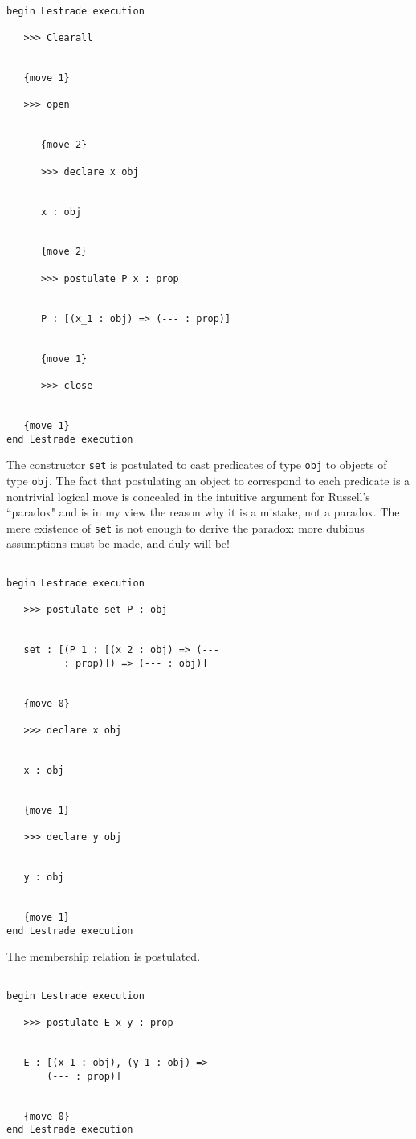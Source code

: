 \documentclass[12pt]{article}
\begin{document}
\newpage

\begin{verbatim}

begin Lestrade execution

   >>> Clearall


   {move 1}

   >>> open


      {move 2}

      >>> declare x obj


      x : obj


      {move 2}

      >>> postulate P x : prop


      P : [(x_1 : obj) => (--- : prop)]


      {move 1}

      >>> close


   {move 1}
end Lestrade execution
\end{verbatim}

The constructor {\tt set} is postulated to cast predicates of type {\tt obj} to objects of type {\tt obj}.  The fact that postulating an object to correspond to each predicate is a nontrivial logical move is concealed in the intuitive argument for Russell's ``paradox"  and is in my view the reason why it is a mistake, not a paradox.  The mere existence of {\tt set} is not enough to derive the paradox:  more dubious assumptions must be made, and duly will be!

\begin{verbatim}

begin Lestrade execution

   >>> postulate set P : obj


   set : [(P_1 : [(x_2 : obj) => (--- 
          : prop)]) => (--- : obj)]


   {move 0}

   >>> declare x obj


   x : obj


   {move 1}

   >>> declare y obj


   y : obj


   {move 1}
end Lestrade execution
\end{verbatim}

The membership relation is postulated.

\begin{verbatim}

begin Lestrade execution

   >>> postulate E x y : prop


   E : [(x_1 : obj), (y_1 : obj) => 
       (--- : prop)]


   {move 0}
end Lestrade execution
\end{verbatim}
\end{document}
